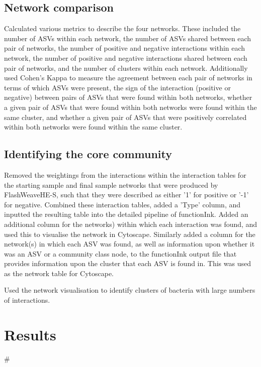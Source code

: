 \documentclass{article}
\begin{document}
\subsection{Network comparison}
Calculated various metrics to describe the four networks. These included the number of ASVs within each network, the number of ASVs shared between each pair of networks, the number of positive and negative interactions within each network, the number of positive and negative interactions shared between each pair of networks, and the number of clusters within each network. Additionally used Cohen's Kappa to measure the agreement between each pair of networks in terms of which ASVs were present, the sign of the interaction (positive or negative) between pairs of ASVs that were found within both networks, whether a given pair of ASVs that were found within both networks were found within the same cluster, and whether a given pair of ASVs that were positively correlated within both networks were found within the same cluster.

\subsection{Identifying the core community}
Removed the weightings from the interactions within the interaction tables for the starting sample and final sample networks that were produced by FlashWeaveHE-S, such that they were described as either '1' for positive or '-1' for negative. Combined these interaction tables, added a 'Type' column, and inputted the resulting table into the detailed pipeline of functionInk. Added an additional column for the networks) within which each interaction was found, and used this to visualise the network in Cytoscape. Similarly added a column for the network(s) in which each ASV was found, as well as information upon whether it was an ASV or a community class node, to the functionInk output file that provides information upon the cluster that each ASV is found in. This was used as the network table for Cytoscape.

Used the network visualisation to identify clusters of bacteria with large numbers of interactions.





\section{Results}

#
\end{document}
